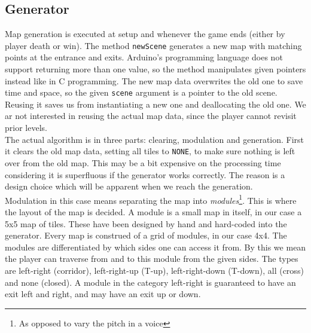 \subsection{Generator} %
Map generation is executed at setup and whenever the game ends (either by player death or win). The method {\tt newScene} generates a new map with matching points at the entrance and exits. Arduino's programming language does not support returning more than one value, so the method manipulates given pointers instead like in C programming. The new map data overwrites the old one to save time and space, so the given {\tt scene} argument is a pointer to the old scene. Reusing it saves us from instantiating a new one and deallocating the old one. We ar not interested in reusing the actual map data, since the player cannot revisit prior levels.\\
The actual algorithm is in three parts: clearing, modulation and generation. First it clears the old map data, setting all tiles to {\tt NONE}, to make sure nothing is left over from the old map. This may be a bit expensive on the processing time considering it is superfluous if the generator works correctly. The reason is a design choice which will be apparent when we reach the generation.\\ %
Modulation in this case means separating the map into \emph{modules}\footnote{As opposed to vary the pitch in a voice}. This is where the layout of the map is decided. A module is a small map in itself, in our case a 5x5 map of tiles. These have been designed by hand and hard-coded into the generator. Every map is construed of a grid of modules, in our case 4x4. The modules are differentiated by which sides one can access it from. By this we mean the player can traverse from and to this module from the given sides. The types are left-right (corridor), left-right-up (T-up), left-right-down (T-down), all (cross) and none (closed). A module in the category left-right is guaranteed to have an exit left and right, and may have an exit up or down.\\
